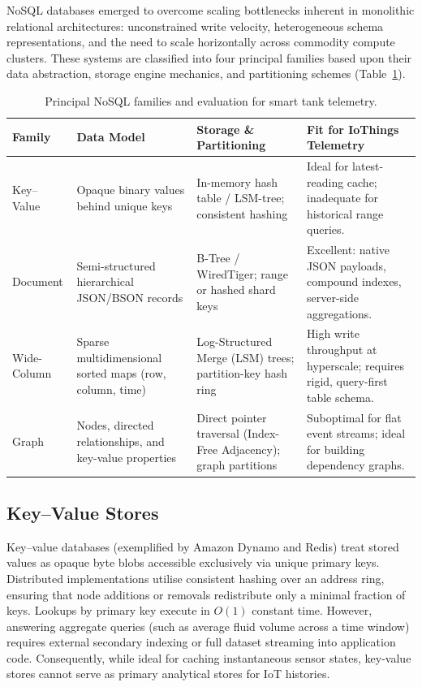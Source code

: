 \documentclass[11pt,a4paper]{article}
\begin{document}
NoSQL databases emerged to overcome scaling bottlenecks inherent in monolithic relational architectures: unconstrained write velocity, heterogeneous schema representations, and the need to scale horizontally across commodity compute clusters. These systems are classified into four principal families based upon their data abstraction, storage engine mechanics, and partitioning schemes (Table~\ref{tab:families}).

\begin{table}[htbp]
\centering\small
\caption{Principal NoSQL families and evaluation for smart tank telemetry.}\label{tab:families}
\begin{tabularx}{\textwidth}{@{}l X X X@{}}
\toprule
Family & Data Model & Storage \& Partitioning & Fit for IoThings Telemetry\\
\midrule
Key--Value & Opaque binary values behind unique keys & In-memory hash table / LSM-tree; consistent hashing & Ideal for latest-reading cache; inadequate for historical range queries.\\
Document & Semi-structured hierarchical JSON/BSON records & B-Tree / WiredTiger; range or hashed shard keys & Excellent: native JSON payloads, compound indexes, server-side aggregations.\\
Wide-Column & Sparse multidimensional sorted maps (row, column, time) & Log-Structured Merge (LSM) trees; partition-key hash ring & High write throughput at hyperscale; requires rigid, query-first table schema.\\
Graph & Nodes, directed relationships, and key-value properties & Direct pointer traversal (Index-Free Adjacency); graph partitions & Suboptimal for flat event streams; ideal for building dependency graphs.\\
\bottomrule
\end{tabularx}
\end{table}

\subsection{Key--Value Stores}
Key--value databases (exemplified by Amazon Dynamo and Redis) treat stored values as opaque byte blobs accessible exclusively via unique primary keys. Distributed implementations utilise consistent hashing over an address ring, ensuring that node additions or removals redistribute only a minimal fraction of keys. Lookups by primary key execute in $O(1)$ constant time. However, answering aggregate queries (such as average fluid volume across a time window) requires external secondary indexing or full dataset streaming into application code. Consequently, while ideal for caching instantaneous sensor states, key-value stores cannot serve as primary analytical stores for IoT histories.
\end{document}
